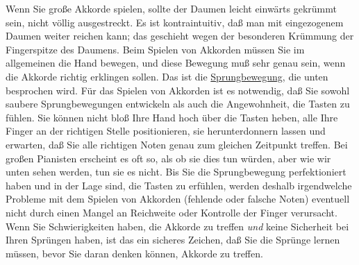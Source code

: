Wenn Sie große Akkorde spielen, sollte der Daumen leicht einwärts gekrümmt sein, nicht völlig ausgestreckt.
Es ist kontraintuitiv, daß man mit eingezogenem Daumen weiter reichen kann; das geschieht wegen der besonderen Krümmung der Fingerspitze des Daumens.
Beim Spielen von Akkorden müssen Sie im allgemeinen die Hand bewegen, und diese Bewegung muß sehr genau sein, wenn die Akkorde richtig erklingen sollen.
Das ist die \hyperlink{c1iii7f}{Sprungbewegung}, die unten besprochen wird.
Für das Spielen von Akkorden ist es notwendig, daß Sie sowohl saubere Sprungbewegungen entwickeln als auch die Angewohnheit, die Tasten zu fühlen.
Sie können nicht bloß Ihre Hand hoch über die Tasten heben, alle Ihre Finger an der richtigen Stelle positionieren, sie herunterdonnern lassen und erwarten, daß Sie alle richtigen Noten genau zum gleichen Zeitpunkt treffen.
Bei großen Pianisten erscheint es oft so, als ob sie dies tun würden, aber wie wir unten sehen werden, tun sie es nicht.
Bis Sie die Sprungbewegung perfektioniert haben und in der Lage sind, die Tasten zu erfühlen, werden deshalb irgendwelche Probleme mit dem Spielen von Akkorden (fehlende oder falsche Noten) eventuell nicht durch einen Mangel an Reichweite oder Kontrolle der Finger verursacht.
Wenn Sie Schwierigkeiten haben, die Akkorde zu treffen \textit{und} keine Sicherheit bei Ihren Sprüngen haben, ist das ein sicheres Zeichen, daß Sie die Sprünge lernen müssen, bevor Sie daran denken können, Akkorde zu treffen.
 


